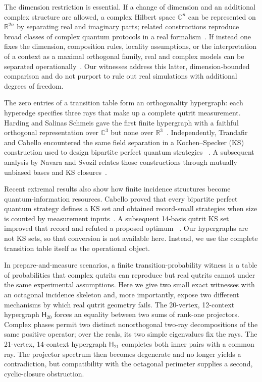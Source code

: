 \documentclass[twocolumn,aps,pra,floatfix,amsmath,amssymb,longbibliography]{revtex4-2}
\theoremstyle{definition}
\theoremstyle{remark}
\newcommand{\C}{\mathbb C}
\newcommand{\R}{\mathbb R}
\newcommand{\Htwenty}{\mathsf H_{20}}
\newcommand{\Htwentyone}{\mathsf H_{21}}
\begin{document}
The dimension restriction is essential.  If a change of dimension and an
additional complex structure are allowed, a complex Hilbert space $\C^n$ can
be represented on $\R^{2n}$ by separating real and imaginary parts; related
constructions reproduce broad classes of complex quantum protocols in a real
formalism~\cite{Hardy2012LimitedHolism,Aleksandrova2013UniversalQubit,
McKague2009SimulatingRealHilbert}.  If instead one fixes the dimension,
composition rules, locality assumptions, or the interpretation of a context
as a maximal orthogonal family, real and complex models can be separated
operationally~\cite{renou-2021,Weilenmann2025PartialIndependencePRL,
Bednorz2022OptimalDiscrimination}.  Our witnesses address this latter,
dimension-bounded comparison and do not purport to rule out real simulations
with additional degrees of freedom.

The zero entries of a transition table form an orthogonality hypergraph: each
hyperedge specifies three rays that make up a complete qutrit measurement.
Harding and Salinas Schmeis gave the first finite hypergraph with a faithful
orthogonal representation over $\C^3$ but none over
$\R^3$~\cite{harding2025remarksIJTP}.  Independently, Trandafir and Cabello
encountered the same field separation in a Kochen--Specker (KS) construction
used to design bipartite perfect quantum strategies
~\cite{2024-cabello-trandafir0}.  A subsequent analysis by Navara and Svozil
relates those constructions through mutually unbiased bases and KS
closures~\cite{svozil-2025-MYOCHS}.

Recent extremal results also show how finite incidence structures become
quantum-information resources.  Cabello proved that every bipartite perfect
quantum strategy defines a KS set and obtained record-small strategies when
size is counted by measurement inputs~\cite{Cabello2025BPQS}.  A subsequent
14-basis qutrit KS set improved that record and refuted a proposed optimum
~\cite{Cabello2025}.  Our hypergraphs are not KS sets, so that conversion is
not available here.  Instead, we use the complete transition table itself as
the operational object.

In prepare-and-measure scenarios, a finite transition-probability witness is a table of probabilities that complex qutrits can reproduce but real qutrits cannot under the same experimental assumptions.
Here we give two small exact witnesses with an octagonal incidence skeleton
and, more importantly, expose two different mechanisms by which real qutrit
geometry fails.  The 20-vertex, 12-context hypergraph $\Htwenty$ forces an
equality between two sums of rank-one projectors.  Complex phases permit two
distinct nonorthogonal two-ray decompositions of the same positive operator;
over the reals, its two simple eigenvalues fix the rays.  The 21-vertex,
14-context hypergraph $\Htwentyone$ completes both inner pairs with a common
ray.  The projector spectrum then becomes degenerate and no longer yields a
contradiction, but compatibility with the octagonal perimeter supplies a
second, cyclic-closure obstruction.
\end{document}
